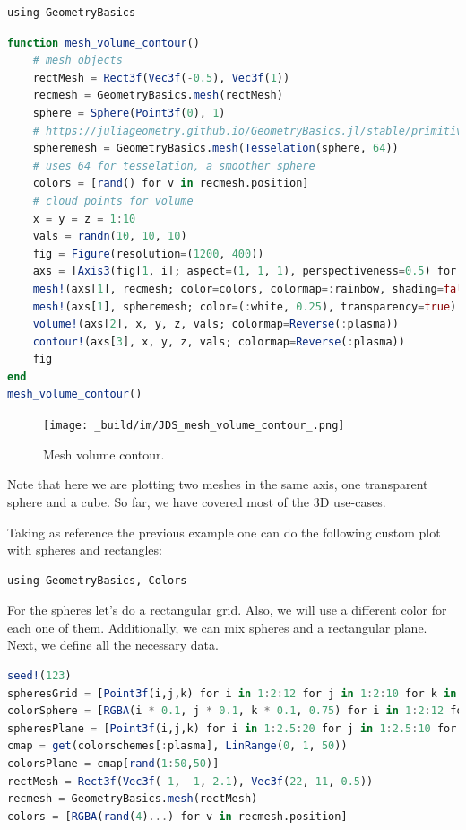 \documentclass[
  notoc %
]{tufte-book}
\begin{document}
\begin{lstlisting}
using GeometryBasics
\end{lstlisting}

\begin{lstlisting}[language=Julia]
function mesh_volume_contour()
    # mesh objects
    rectMesh = Rect3f(Vec3f(-0.5), Vec3f(1))
    recmesh = GeometryBasics.mesh(rectMesh)
    sphere = Sphere(Point3f(0), 1)
    # https://juliageometry.github.io/GeometryBasics.jl/stable/primitives/
    spheremesh = GeometryBasics.mesh(Tesselation(sphere, 64))
    # uses 64 for tesselation, a smoother sphere
    colors = [rand() for v in recmesh.position]
    # cloud points for volume
    x = y = z = 1:10
    vals = randn(10, 10, 10)
    fig = Figure(resolution=(1200, 400))
    axs = [Axis3(fig[1, i]; aspect=(1, 1, 1), perspectiveness=0.5) for i = 1:3]
    mesh!(axs[1], recmesh; color=colors, colormap=:rainbow, shading=false)
    mesh!(axs[1], spheremesh; color=(:white, 0.25), transparency=true)
    volume!(axs[2], x, y, z, vals; colormap=Reverse(:plasma))
    contour!(axs[3], x, y, z, vals; colormap=Reverse(:plasma))
    fig
end
mesh_volume_contour()
\end{lstlisting}

\begin{figure}
\hypertarget{fig:mesh_volume_contour}{%
\centering
\texttt{[image: \_build/im/JDS\_mesh\_volume\_contour\_.png]}
\caption{Mesh volume contour.}\label{fig:mesh_volume_contour}
}
\end{figure}

Note that here we are plotting two meshes in the same axis, one
transparent sphere and a cube. So far, we have covered most of the 3D
use-cases.

Taking as reference the previous example one can do the following custom
plot with spheres and rectangles:

\begin{lstlisting}
using GeometryBasics, Colors
\end{lstlisting}

For the spheres let's do a rectangular grid. Also, we will use a
different color for each one of them. Additionally, we can mix spheres
and a rectangular plane. Next, we define all the necessary data.

\begin{lstlisting}[language=Julia]
seed!(123)
spheresGrid = [Point3f(i,j,k) for i in 1:2:12 for j in 1:2:10 for k in 1:2:10]
colorSphere = [RGBA(i * 0.1, j * 0.1, k * 0.1, 0.75) for i in 1:2:12 for j in 1:2:10 for k in 1:2:10]
spheresPlane = [Point3f(i,j,k) for i in 1:2.5:20 for j in 1:2.5:10 for k in 1:2.5:4]
cmap = get(colorschemes[:plasma], LinRange(0, 1, 50))
colorsPlane = cmap[rand(1:50,50)]
rectMesh = Rect3f(Vec3f(-1, -1, 2.1), Vec3f(22, 11, 0.5))
recmesh = GeometryBasics.mesh(rectMesh)
colors = [RGBA(rand(4)...) for v in recmesh.position]
\end{lstlisting}
\end{document}
